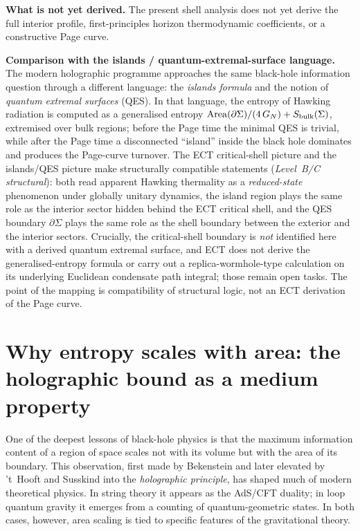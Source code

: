\documentclass[11pt,a4paper]{article}
\begin{document}
\textbf{What is not yet derived.}
The present shell analysis does not yet derive the full interior profile, first-principles horizon thermodynamic coefficients, or a constructive Page curve.

\textbf{Comparison with the islands / quantum-extremal-surface language.}
The modern holographic programme approaches the same black-hole
information question through a different language: the \emph{islands
formula} and the notion of \emph{quantum extremal surfaces} (QES).
In that language, the entropy of Hawking radiation is computed as a
generalised entropy $\mathrm{Area}(\partial\Sigma)/(4\,G_N)+S_{\rm bulk}(\Sigma)$,
extremised over bulk regions; before the Page time the minimal QES
is trivial, while after the Page time a disconnected ``island''
inside the black hole dominates and produces the Page-curve
turnover.
The ECT critical-shell picture and the islands/QES picture make
structurally compatible statements (\emph{Level~B/C structural}):
both read apparent Hawking thermality as a \emph{reduced-state}
phenomenon under globally unitary dynamics, the island region plays
the same role as the interior sector hidden behind the ECT critical
shell, and the QES boundary $\partial\Sigma$ plays the same role as
the shell boundary between the exterior and the interior sectors.
Crucially, the critical-shell boundary is \emph{not} identified here
with a derived quantum extremal surface, and ECT does not derive
the generalised-entropy formula or carry out a replica-wormhole-type
calculation on its underlying Euclidean condensate path integral;
those remain open tasks. The point of the mapping is compatibility
of structural logic, not an ECT derivation of the Page curve.

\section{Why entropy scales with area: the holographic bound as a medium property}
\label{sec:pop_area_law}

One of the deepest lessons of black-hole physics is that the maximum
information content of a region of space scales not with its volume
but with the area of its boundary.
This observation, first made by
Bekenstein and later elevated by 't~Hooft and Susskind into the
\emph{holographic principle}, has shaped much of modern theoretical
physics.
In string theory it appears as the AdS/CFT duality; in loop quantum
gravity it emerges from a counting of quantum-geometric states.
In both cases, however, area scaling is tied to specific features of
the gravitational theory.
\end{document}
